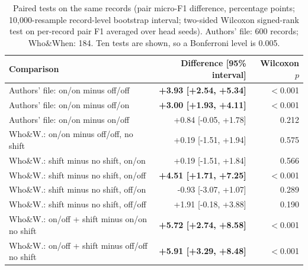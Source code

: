 \begin{table}[t]
\caption{Paired tests on the same records (pair micro-F1 difference, percentage points; 10,000-resample record-level bootstrap interval; two-sided Wilcoxon signed-rank test on per-record pair F1 averaged over head seeds). Authors' file: 600 records; Who\&When: 184. Ten tests are shown, so a Bonferroni level is 0.005.}
\label{tab:paired}
\centering\footnotesize\setlength{\tabcolsep}{3pt}
\begin{tabular}{@{}lrr@{}}
\toprule
Comparison & Difference [95\% interval] & Wilcoxon $p$ \\
\midrule
Authors' file: on/on minus off/off & \textbf{+3.93 {\scriptsize[+2.54, +5.34]}} & $<$0.001 \\
Authors' file: on/on minus off/on & \textbf{+3.00 {\scriptsize[+1.93, +4.11]}} & $<$0.001 \\
Authors' file: on/on minus on/off & +0.84 {\scriptsize[-0.05, +1.78]} & 0.212 \\
Who\&W.: on/on minus off/off, no shift & +0.19 {\scriptsize[-1.51, +1.94]} & 0.575 \\
Who\&W.: shift minus no shift, on/on & +0.19 {\scriptsize[-1.51, +1.84]} & 0.566 \\
Who\&W.: shift minus no shift, on/off & \textbf{+4.51 {\scriptsize[+1.71, +7.25]}} & $<$0.001 \\
Who\&W.: shift minus no shift, off/on & -0.93 {\scriptsize[-3.07, +1.07]} & 0.289 \\
Who\&W.: shift minus no shift, off/off & +1.91 {\scriptsize[-0.18, +3.88]} & 0.190 \\
Who\&W.: on/off + shift minus on/on no shift & \textbf{+5.72 {\scriptsize[+2.74, +8.58]}} & $<$0.001 \\
Who\&W.: on/off + shift minus off/off no shift & \textbf{+5.91 {\scriptsize[+3.29, +8.48]}} & $<$0.001 \\
\bottomrule
\end{tabular}
\end{table}
